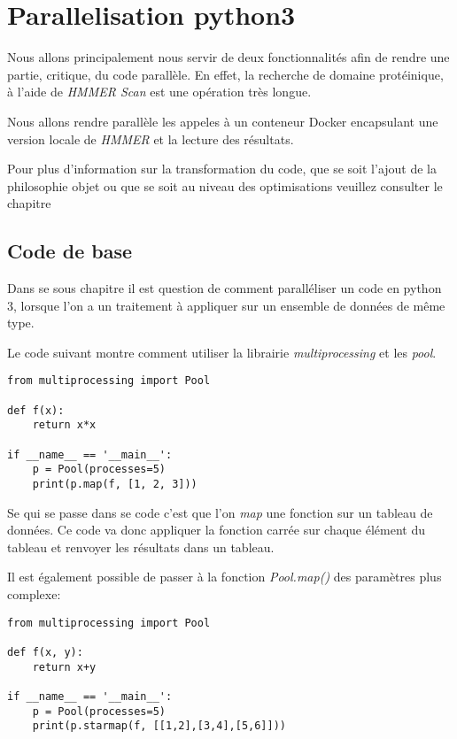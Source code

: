 \chapter{Parallelisation python3}
\label{ch:parallel}

Nous allons principalement nous servir de deux fonctionnalités afin de rendre une partie, critique, du code parallèle. En effet, la recherche de domaine protéinique, à l'aide de \emph{HMMER Scan} est une opération très longue.

Nous allons rendre parallèle les appeles à un conteneur Docker encapsulant une version locale de \emph{HMMER} et la lecture des résultats.

Pour plus d'information sur la transformation du code, que se soit l'ajout de la philosophie objet ou que se soit au niveau des optimisations veuillez consulter le chapitre 

\section{Code de base}

Dans se sous chapitre il est question de comment paralléliser un code en python 3, lorsque l'on a un traitement à appliquer sur un ensemble de données de même type.

Le code suivant montre comment utiliser la librairie \emph{multiprocessing} et les \emph{pool}.

\lstset{language=python}
\begin{lstlisting}[frame=single]
from multiprocessing import Pool

def f(x):
    return x*x

if __name__ == '__main__':
    p = Pool(processes=5)
    print(p.map(f, [1, 2, 3]))
\end{lstlisting} 

Se qui se passe dans se code c'est que l'on \emph{map} une fonction sur un tableau de données. Ce code va donc appliquer la fonction carrée sur chaque élément du tableau et renvoyer les résultats dans un tableau.

Il est également possible de passer à la fonction \emph{Pool.map()} des paramètres plus complexe:

\lstset{language=python}
\begin{lstlisting}[frame=single]
from multiprocessing import Pool

def f(x, y):
    return x+y

if __name__ == '__main__':
    p = Pool(processes=5)
    print(p.starmap(f, [[1,2],[3,4],[5,6]]))
\end{lstlisting} 

